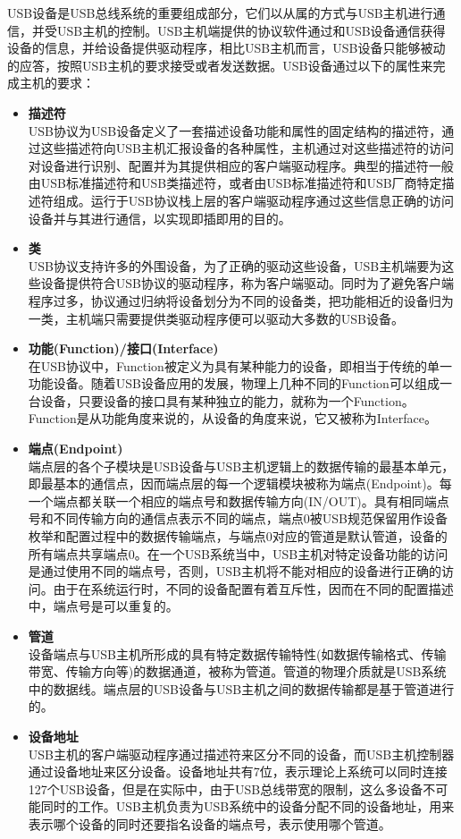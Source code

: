 \begin{enumerate}
	USB设备是USB总线系统的重要组成部分，它们以从属的方式与USB主机进行通信，并受USB主机的控制。USB主机端提供的协议软件通过和USB设备通信获得设备的信息，并给设备提供驱动程序，相比USB主机而言，USB设备只能够被动的应答，按照USB主机的要求接受或者发送数据。USB设备通过以下的属性来完成主机的要求：
	\begin{itemize}
	\item \textbf{描述符}\\
	USB协议为USB设备定义了一套描述设备功能和属性的固定结构的描述符，通过这些描述符向USB主机汇报设备的各种属性，主机通过对这些描述符的访问对设备进行识别、配置并为其提供相应的客户端驱动程序。典型的描述符一般由USB标准描述符和USB类描述符，或者由USB标准描述符和USB厂商特定描述符组成。运行于USB协议栈上层的客户端驱动程序通过这些信息正确的访问设备并与其进行通信，以实现即插即用的目的。
	\item \textbf{类}\\
	USB协议支持许多的外围设备，为了正确的驱动这些设备，USB主机端要为这些设备提供符合USB协议的驱动程序，称为客户端驱动。同时为了避免客户端程序过多，协议通过归纳将设备划分为不同的设备类，把功能相近的设备归为一类，主机端只需要提供类驱动程序便可以驱动大多数的USB设备。	
	\item \textbf{功能(Function)/接口(Interface)}\\
	在USB协议中，Function被定义为具有某种能力的设备，即相当于传统的单一功能设备。随着USB设备应用的发展，物理上几种不同的Function可以组成一台设备，只要设备的接口具有某种独立的能力，就称为一个Function。Function是从功能角度来说的，从设备的角度来说，它又被称为Interface。
	\item \textbf{端点(Endpoint)}\\
	端点层的各个子模块是USB设备与USB主机逻辑上的数据传输的最基本单元，即最基本的通信点，因而端点层的每一个逻辑模块被称为端点(Endpoint)。每一个端点都关联一个相应的端点号和数据传输方向(IN/OUT)。具有相同端点号和不同传输方向的通信点表示不同的端点，端点0被USB规范保留用作设备枚举和配置过程中的数据传输端点，与端点0对应的管道是默认管道，设备的所有端点共享端点0。在一个USB系统当中，USB主机对特定设备功能的访问是通过使用不同的端点号，否则，USB主机将不能对相应的设备进行正确的访问。由于在系统运行时，不同的设备配置有着互斥性，因而在不同的配置描述中，端点号是可以重复的。
	\item \textbf{管道}\\
	设备端点与USB主机所形成的具有特定数据传输特性(如数据传输格式、传输带宽、传输方向等)的数据通道，被称为管道。管道的物理介质就是USB系统中的数据线。端点层的USB设备与USB主机之间的数据传输都是基于管道进行的。
	\item \textbf{设备地址}\\
	USB主机的客户端驱动程序通过描述符来区分不同的设备，而USB主机控制器通过设备地址来区分设备。设备地址共有7位，表示理论上系统可以同时连接127个USB设备，但是在实际中，由于USB总线带宽的限制，这么多设备不可能同时的工作。USB主机负责为USB系统中的设备分配不同的设备地址，用来表示哪个设备的同时还要指名设备的端点号，表示使用哪个管道。
	\end{itemize}	
	
\end{enumerate}


